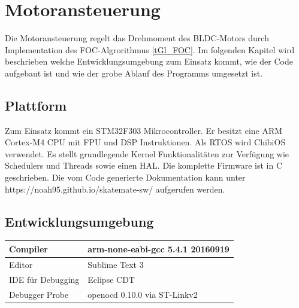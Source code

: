 \section{Motoransteuerung} \label{SW_Motoransteuerung}
Die Motoransteuerung regelt das Drehmoment des BLDC-Motors durch Implementation des FOC-Algrorithmus \ref{tGl_FOC}. Im folgenden Kapitel wird beschrieben welche Entwicklungsumgebung zum Einsatz kommt, wie der Code aufgebaut ist und wie der grobe Ablauf des Programms umgesetzt ist.

\subsection*{Plattform}
Zum Einsatz kommt ein STM32F303 Mikrocontroller. Er besitzt eine ARM Cortex-M4 CPU mit FPU und DSP Instruktionen. Als RTOS wird ChibiOS verwendet. Es stellt grundlegende Kernel Funktionalitäten zur Verfügung wie Schedulers und Threads sowie einen HAL. Die komplette Firmware ist in C geschrieben. Die vom Code generierte Dokumentation kann unter https://noah95.github.io/skatemate-sw/ aufgerufen werden.
\subsection*{Entwicklungsumgebung}
\begin{center}
	\begin{tabular}{  l | l  }
		\hline
		Compiler & arm-none-eabi-gcc 5.4.1 20160919 \\ \hline
		Editor & Sublime Text 3 \\ \hline
		IDE für Debugging & Eclipse CDT \\ \hline
		Debugger Probe & openocd 0.10.0 via ST-Linkv2 \\ \hline
	\end{tabular}
\end{center}



